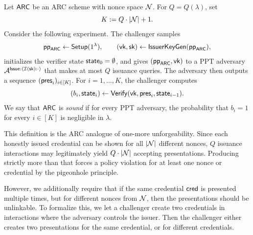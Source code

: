 \begin{definition}\label{def:arc-soundness}
Let \(\mathsf{ARC}\) be an ARC scheme with nonce space \(\mathcal{N}\). For \(Q=Q(\lambda)\), set
\[
K:=Q\cdot |\mathcal{N}|+1.
\]
Consider the following experiment. The challenger samples
\[
\mathsf{pp}_{\mathsf{ARC}}\gets \mathsf{Setup}(1^\lambda),\qquad (\mathsf{vk},\mathsf{sk})\gets \mathsf{IssuerKeyGen}(\mathsf{pp}_{\mathsf{ARC}}),
\]
initializes the verifier state \(\mathsf{state}_0=\emptyset \), and gives \((\mathsf{pp}_{\mathsf{ARC}},\mathsf{vk})\) to a PPT adversary
\(\mathcal{A}^{\mathsf{Issue}:\langle \mathcal{I}(\mathsf{sk}): \cdot \rangle}\) that makes at most \(Q\) issuance queries. The adversary then
outputs a sequence \((\mathsf{pres}_i)_{i\in [K]}\). For \(i=1,\ldots,K\), the challenger computes
\[
(b_i,\mathsf{state}_i)\gets \mathsf{Verify}(\mathsf{vk},\mathsf{pres}_i,\mathsf{state}_{i-1}).
\]
We say that \(\mathsf{ARC}\) is \emph{sound} if for every PPT adversary, the probability that \(b_i=1\) for every
\(i\in[K]\) is negligible in \(\lambda\).
\end{definition}

This definition is the ARC analogue of one-more unforgeability. Since each honestly issued credential can be shown for
all \(|\mathcal{N}|\) different nonces, \(Q\) issuance interactions may legitimately yield \(Q\cdot |\mathcal{N}|\)
accepting presentations. Producing strictly more than that forces a policy violation for at least one nonce or credential by the
pigeonhole principle.

However, we additionally require that if the same credential \(\mathsf{cred}\) is presented multiple times, but for
different nonces from \(\mathcal{N}\), then the presentations should be unlinkable. To formalize this, we let a
challenger create two credentials in interactions where the adversary controls the issuer. Then the challenger either
creates two presentations for the same credential, or for different credentials.

